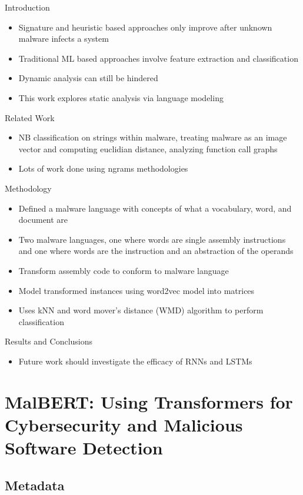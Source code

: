 \documentclass{article}
\begin{document}
Introduction
\begin{itemize}
\item Signature and heuristic based approaches only improve after unknown malware infects a system
\item Traditional ML based approaches involve feature extraction and classification
\item Dynamic analysis can still be hindered
\item This work explores static analysis via language modeling
\end{itemize}
Related Work
\begin{itemize}
\item NB classification on strings within malware, treating malware as an image vector and computing euclidian distance, analyzing function call graphs
\item Lots of work done using ngrams methodologies
\end{itemize}
Methodology
\begin{itemize}
\item Defined a malware language with concepts of what a vocabulary, word, and document are
\item Two malware languages, one where words are single assembly instructions and one where words are the instruction and an abstraction of the operands
\item Transform assembly code to conform to malware language
\item Model transformed instances using word2vec model into matrices
\item Uses kNN and word mover's distance (WMD) algorithm to perform classification
\end{itemize}
Results and Conclusions
\begin{itemize}
\item Future work should investigate the efficacy of RNNs and LSTMs
\end{itemize}

\pagebreak


\section*{MalBERT: Using Transformers for Cybersecurity and Malicious Software Detection}

\subsection*{Metadata}
\end{document}

